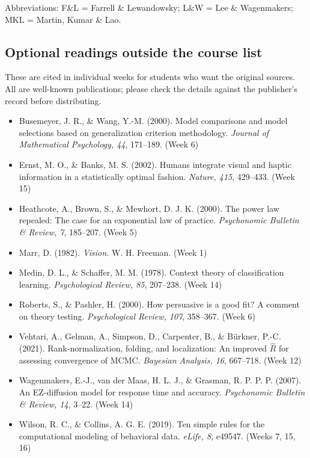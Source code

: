 Abbreviations: F\&L = Farrell \& Lewandowsky; L\&W = Lee \& Wagenmakers;
MKL = Martin, Kumar \& Lao.

\subsection{Optional readings outside the course list}

These are cited in individual weeks for students who want the original
sources. All are well-known publications; please check the details
against the publisher's record before distributing.

\begin{itemize}
\tightlist
\item
  Busemeyer, J. R., \& Wang, Y.-M. (2000). Model comparisons and model
  selections based on generalization criterion methodology.
  \emph{Journal of Mathematical Psychology, 44}, 171--189. (Week 6)
\item
  Ernst, M. O., \& Banks, M. S. (2002). Humans integrate visual and
  haptic information in a statistically optimal fashion. \emph{Nature,
  415}, 429--433. (Week 15)
\item
  Heathcote, A., Brown, S., \& Mewhort, D. J. K. (2000). The power law
  repealed: The case for an exponential law of practice.
  \emph{Psychonomic Bulletin \& Review, 7}, 185--207. (Week 5)
\item
  Marr, D. (1982). \emph{Vision.} W. H. Freeman. (Week 1)
\item
  Medin, D. L., \& Schaffer, M. M. (1978). Context theory of
  classification learning. \emph{Psychological Review, 85}, 207--238.
  (Week 14)
\item
  Roberts, S., \& Pashler, H. (2000). How persuasive is a good fit? A
  comment on theory testing. \emph{Psychological Review, 107}, 358--367.
  (Week 6)
\item
  Vehtari, A., Gelman, A., Simpson, D., Carpenter, B., \& Bürkner, P.-C.
  (2021). Rank-normalization, folding, and localization: An improved
  \(\hat R\) for assessing convergence of MCMC. \emph{Bayesian Analysis,
  16}, 667--718. (Week 12)
\item
  Wagenmakers, E.-J., van der Maas, H. L. J., \& Grasman, R. P. P. P.
  (2007). An EZ-diffusion model for response time and accuracy.
  \emph{Psychonomic Bulletin \& Review, 14}, 3--22. (Week 14)
\item
  Wilson, R. C., \& Collins, A. G. E. (2019). Ten simple rules for the
  computational modeling of behavioral data. \emph{eLife, 8}, e49547.
  (Weeks 7, 15, 16)
\end{itemize}
